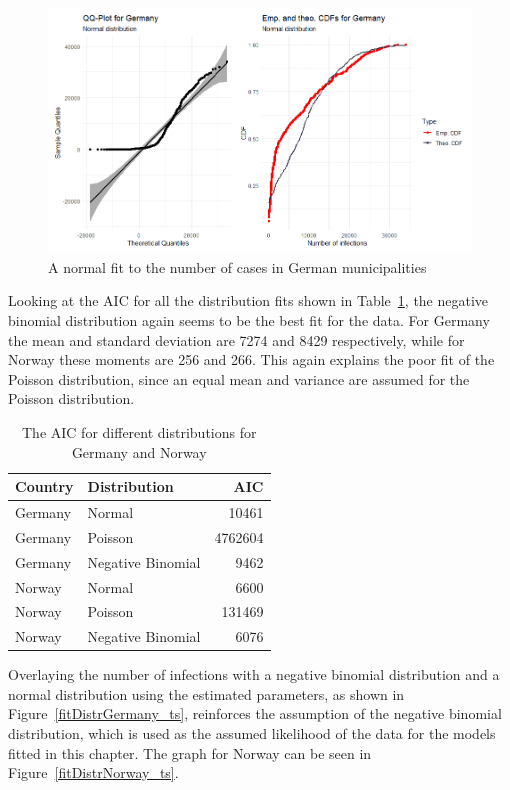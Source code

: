 \begin{figure}[H]
  \centering
  \includegraphics[width = \textwidth]{fit_normal_germany_ts.png}
  \caption{A normal fit to the number of cases in German municipalities}
  \label{fitNormalGermany_ts}
\end{figure}
Looking at the AIC for all the distribution fits shown in Table~\ref{aic_temporal}, the negative binomial distribution again seems to be the best fit for the data. For Germany the mean and standard deviation are 7274 and 8429 respectively, while for Norway these moments are 256 and 266. This again explains the poor fit of the Poisson distribution, since an equal mean and variance are assumed for the Poisson distribution.
\begin{table}[H] 
\caption{The AIC for different distributions for Germany and Norway \label{aic_temporal}}
\begin{tabular}{l l r}
\toprule
\textbf{Country}	& \textbf{Distribution}	& \textbf{AIC} \\
\midrule
Germany & Normal & 10461 \\
Germany & Poisson & 4762604 \\
Germany & Negative Binomial & 9462 \\
Norway & Normal & 6600 \\
Norway & Poisson & 131469 \\
Norway & Negative Binomial & 6076 \\
\bottomrule
\end{tabular}
\end{table}
Overlaying the number of infections with a negative binomial distribution and a normal distribution using the estimated parameters, as shown in Figure~\ref{fitDistrGermany_ts}, reinforces the assumption of the negative binomial distribution, which is used as the assumed likelihood of the data for the models fitted in this chapter. The graph for Norway can be seen in Figure~\ref{fitDistrNorway_ts}.
